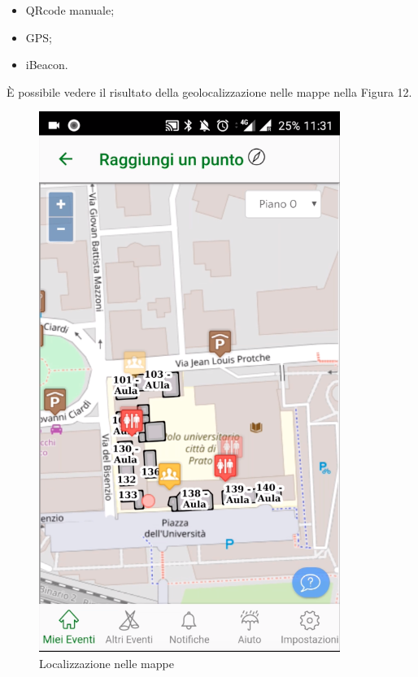 \begin{itemize}
    \item QRcode manuale;
    \item GPS;
    \item iBeacon.
\end{itemize}


È possibile vedere il risultato della geolocalizzazione nelle mappe
nella Figura 12.
\begin{figure}[H]
    \caption{Localizzazione nelle mappe}
    \centering  
    \includegraphics[scale=0.5]{img/cap2/geo-1}
\end{figure}


